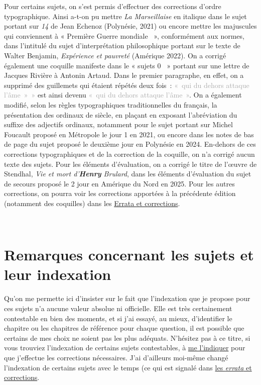 Pour certains sujets, on s'est permis d'effectuer des corrections d'ordre typographique. Ainsi a-t-on pu mettre \textit{La Marseillaise} en italique dans le sujet portant sur \textit{14} de Jean Echenoz (Polynésie, 2021) ou encore mettre les majuscules qui conviennent à « Première Guerre mondiale ~»{}, conformément aux normes, dans l'intitulé du sujet d'interprétation philosophique portant sur le texte de Walter Benjamin, \textit{Expérience et pauvreté} (Amérique 2022). On a corrigé également une coquille manifeste dans le « sujets 0 ~»{} portant sur une lettre de Jacques Rivière à Antonin Artaud. Dans le premier paragraphe, en effet, on a supprimé des guillemets qui étaient répétés deux fois~: \textcolor{darkgray}{«~qui du dehors attaque l'âme~»~»} est ainsi devenu \textcolor{darkgray}{«~qui du dehors attaque l'âme~»}. On a également modifié, selon les règles typographiques traditionnelles du français, la présentation des ordinaux de siècle, en plaçant en exposant l'abréviation du suffixe des adjectifs ordinaux, notamment pour le sujet portant sur Michel Foucault proposé en Métropole le jour 1 en 2021, ou encore dans les notes de bas de page du sujet proposé le deuxième jour en Polynésie en 2024. En-dehors de ces corrections typographiques et de la correction de la coquille, on n'a corrigé aucun texte des sujets. Pour les éléments d'évaluation, on a corrigé le titre de l'œuvre de Stendhal, \emph{Vie et mort d'\textbf{Henry} Brulard}, dans les éléments d'évaluation du sujet de secours proposé le 2\ieme{} jour en Amérique du Nord en 2025. Pour les autres corrections, on pourra voir les corrections apportées à la précédente édition (notamment des coquilles) dans les \hyperlink{errata}{Errata et corrections}.

\vfill{~}\clearpage

\section*{Remarques concernant les sujets et leur indexation}

Qu'on me permette ici d'insister sur le fait que l'indexation que je propose pour ces sujets n'a aucune valeur absolue ni officielle. Elle est très certainement contestable en bien des moments, et si j'ai essayé, au mieux, d'identifier le chapitre ou les chapitres de référence pour chaque question, il est possible que certains de mes choix ne soient pas les plus adéquats. N'hésitez pas à ce titre, si vous trouviez l'indexation de certains sujets contestables, à \href{mailto:mikael.quesseveur@ac-lille.fr}{me l'indiquer} pour que j'effectue les corrections nécessaires. J'ai d'ailleurs moi-même changé l'indexation de certains sujets avec le temps (ce qui est signalé dans \hyperlink{errata}{les \textit{errata} et corrections}.

